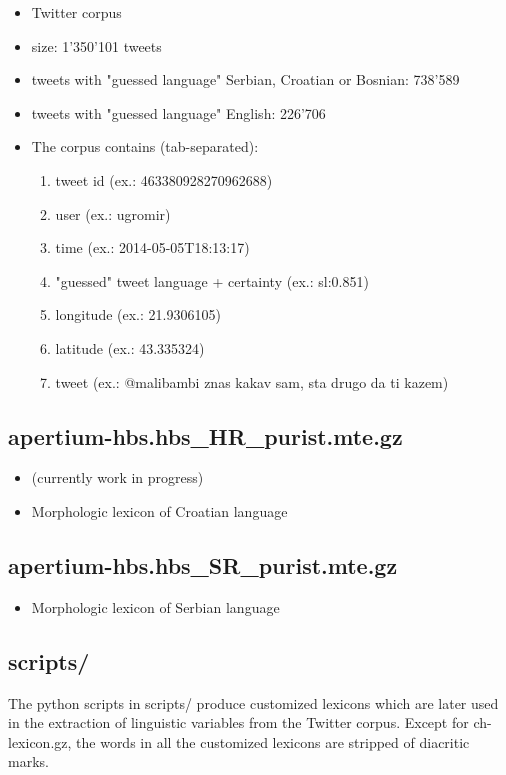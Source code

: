 \documentclass[a4paper]{article}
\begin{document}
\begin{itemize}

\item Twitter corpus
\item size: 1'350'101 tweets
\item tweets with "guessed language" Serbian, Croatian or Bosnian: 738'589
\item tweets with "guessed language" English: 226'706
\item The corpus contains (tab-separated):
\begin{enumerate}
\item tweet id (ex.: 463380928270962688)
\item user (ex.: ugromir)
\item time (ex.: 2014-05-05T18:13:17)
\item "guessed" tweet language + certainty (ex.: sl:0.851)
\item longitude (ex.: 21.9306105)
\item latitude (ex.: 43.335324)
\item tweet (ex.: @malibambi znas kakav sam, sta drugo da ti kazem)
\end{enumerate}
\end{itemize}



\subsection{apertium-hbs.hbs\_HR\_purist.mte.gz}
\begin{itemize}
\item (currently work in progress)
\item Morphologic lexicon of Croatian language
\end{itemize}


\subsection{apertium-hbs.hbs\_SR\_purist.mte.gz}
\begin{itemize}
\item Morphologic lexicon of Serbian language
\end{itemize}

\subsection{scripts/}
The python scripts in scripts/ produce customized lexicons which are later used in the extraction of linguistic variables from the Twitter corpus. Except for ch-lexicon.gz, the words in all the customized lexicons are stripped of diacritic marks.
\end{document}
